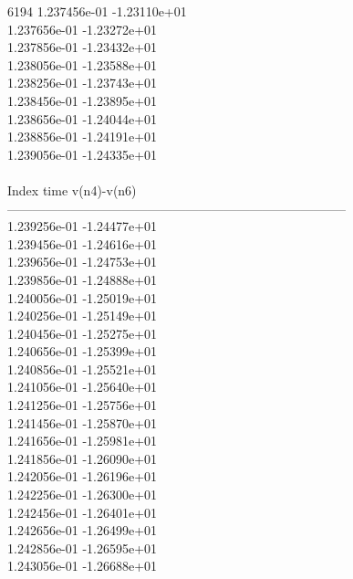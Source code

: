 6194	1.237456e-01	-1.23110e+01	\\ 	1.237656e-01	-1.23272e+01	\\ 	1.237856e-01	-1.23432e+01	\\ 	1.238056e-01	-1.23588e+01	\\ 	1.238256e-01	-1.23743e+01	\\ 	1.238456e-01	-1.23895e+01	\\ 	1.238656e-01	-1.24044e+01	\\ 	1.238856e-01	-1.24191e+01	\\ 	1.239056e-01	-1.24335e+01	\\ \hline
\\ \hline
Index   time            v(n4)-v(n6)     \\ \hline
--------------------------------------------------------------------------------\\ 	1.239256e-01	-1.24477e+01	\\ 	1.239456e-01	-1.24616e+01	\\ 	1.239656e-01	-1.24753e+01	\\ 	1.239856e-01	-1.24888e+01	\\ 	1.240056e-01	-1.25019e+01	\\ 	1.240256e-01	-1.25149e+01	\\ 	1.240456e-01	-1.25275e+01	\\ 	1.240656e-01	-1.25399e+01	\\ 	1.240856e-01	-1.25521e+01	\\ 	1.241056e-01	-1.25640e+01	\\ 	1.241256e-01	-1.25756e+01	\\ 	1.241456e-01	-1.25870e+01	\\ 	1.241656e-01	-1.25981e+01	\\ 	1.241856e-01	-1.26090e+01	\\ 	1.242056e-01	-1.26196e+01	\\ 	1.242256e-01	-1.26300e+01	\\ 	1.242456e-01	-1.26401e+01	\\ 	1.242656e-01	-1.26499e+01	\\ 	1.242856e-01	-1.26595e+01	\\ 	1.243056e-01	-1.26688e+01	\\ \hline
